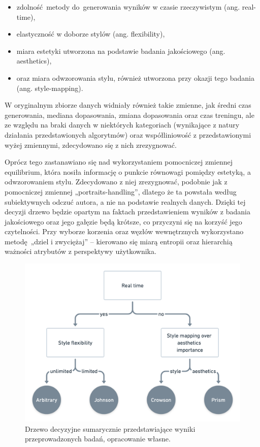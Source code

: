 \documentclass[12pt]{article}
\begin{document}
\begin{itemize}
    \item zdolność metody do generowania wyników w czasie rzeczywistym (ang. real-time),
    \item elastyczność w doborze stylów (ang. flexibility), 
    \item miara estetyki utworzona na podstawie badania jakościowego (ang. aesthetics),
    \item oraz miara odwzorowania stylu, również utworzona przy okazji tego badania (ang. style-mapping).
\end{itemize}

W oryginalnym zbiorze danych widniały również takie zmienne, jak średni czas generowania, mediana dopasowania, zmiana dopasowania oraz czas treningu, ale ze względu na braki danych w niektórych kategoriach (wynikające z natury działania przedstawionych algorytmów) oraz współliniowość z przedstawionymi wyżej zmiennymi, zdecydowano się z nich zrezygnować. 

Oprócz tego zastanawiano się nad wykorzystaniem pomocniczej zmiennej equilibrium, która nosiła informację o punkcie równowagi pomiędzy estetyką, a odwzorowaniem stylu. Zdecydowano z niej zrezygnować, podobnie jak z pomocniczej zmiennej „portraits-handling”, dlatego że ta powstała według subiektywnych odczuć autora, a nie na podstawie realnych danych. Dzięki tej decyzji drzewo będzie opartym na faktach przedstawieniem wyników z badania jakościowego oraz jego gałęzie będą krótsze, co przyczyni się na korzyść jego czytelności. Przy wyborze korzenia oraz węzłów wewnętrznych wykorzystano metodę „dziel i zwyciężaj” – kierowano się miarą entropii oraz hierarchią ważności atrybutów z perspektywy użytkownika.

\begin{figure}[H]
    \centering
    \includegraphics[width=\textwidth]{p13}
    \caption{Drzewo decyzyjne sumarycznie przedstawiające wyniki przeprowadzonych badań, opracowanie własne.}
    \label{fig:30}
\end{figure}
\end{document}
